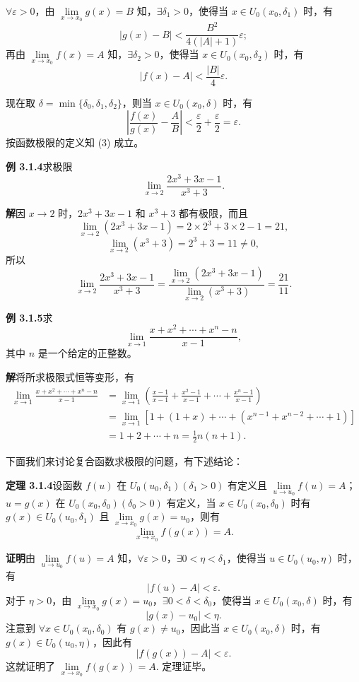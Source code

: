 \documentclass[UTF8,12pt,a4paper,fontset=fandol]{ctexart}
\begin{document}
$\forall\varepsilon>0$，由 $\lim\limits_{x\to x_0}g(x)=B$ 知，$\exists\delta_1>0$，使得当 $x\in U_0(x_0,\delta_1)$ 时，有
\[
  |g(x)-B|<\frac{B^2}{4(|A|+1)}\varepsilon;
\]
再由 $\lim\limits_{x\to x_0}f(x)=A$ 知，$\exists\delta_2>0$，使得当 $x\in U_0(x_0,\delta_2)$ 时，有
\[
  |f(x)-A|<\frac{|B|}{4}\varepsilon.
\]

现在取 $\delta=\min\{\delta_0,\delta_1,\delta_2\}$，则当 $x\in U_0(x_0,\delta)$ 时，有
\[
  \left|\frac{f(x)}{g(x)}-\frac{A}{B}\right|
  <\frac{\varepsilon}{2}+\frac{\varepsilon}{2}=\varepsilon.
\]
按函数极限的定义知 (3) 成立。

\noindent\textbf{例 3.1.4}\quad 求极限
\[
  \lim_{x\to2}\frac{2x^3+3x-1}{x^3+3}.
\]

\noindent\textbf{解}\quad 因 $x\to2$ 时，$2x^3+3x-1$ 和 $x^3+3$ 都有极限，而且
\[
  \lim_{x\to2}(2x^3+3x-1)=2\times2^3+3\times2-1=21,
\]
\[
  \lim_{x\to2}(x^3+3)=2^3+3=11\ne0,
\]
所以
\[
  \lim_{x\to2}\frac{2x^3+3x-1}{x^3+3}
  =\frac{\lim\limits_{x\to2}(2x^3+3x-1)}
  {\lim\limits_{x\to2}(x^3+3)}
  =\frac{21}{11}.
\]

\noindent\textbf{例 3.1.5}\quad 求
\[
  \lim_{x\to1}\frac{x+x^2+\cdots+x^n-n}{x-1},
\]
其中 $n$ 是一个给定的正整数。

\noindent\textbf{解}\quad 将所求极限式恒等变形，有
\[
\begin{aligned}
  \lim_{x\to1}\frac{x+x^2+\cdots+x^n-n}{x-1}
  &=\lim_{x\to1}\left(\frac{x-1}{x-1}+\frac{x^2-1}{x-1}+\cdots+\frac{x^n-1}{x-1}\right)\\
  &=\lim_{x\to1}\left[1+(1+x)+\cdots+(x^{n-1}+x^{n-2}+\cdots+1)\right]\\
  &=1+2+\cdots+n=\frac12 n(n+1).
\end{aligned}
\]

下面我们来讨论复合函数求极限的问题，有下述结论：

\noindent\textbf{定理 3.1.4}\quad 设函数 $f(u)$ 在 $U_0(u_0,\delta_1)(\delta_1>0)$ 有定义且 $\lim\limits_{u\to u_0}f(u)=A$；$u=g(x)$ 在 $U_0(x_0,\delta_0)(\delta_0>0)$ 有定义，当 $x\in U_0(x_0,\delta_0)$ 时有 $g(x)\in U_0(u_0,\delta_1)$ 且 $\lim\limits_{x\to x_0}g(x)=u_0$，则有
\[
  \lim_{x\to x_0}f(g(x))=A.
\]

\noindent\textbf{证明}\quad 由 $\lim\limits_{u\to u_0}f(u)=A$ 知，$\forall\varepsilon>0$，$\exists 0<\eta<\delta_1$，使得当 $u\in U_0(u_0,\eta)$ 时，有
\[
  |f(u)-A|<\varepsilon.
\]
对于 $\eta>0$，由 $\lim\limits_{x\to x_0}g(x)=u_0$，$\exists 0<\delta<\delta_0$，使得当 $x\in U_0(x_0,\delta)$ 时，有
\[
  |g(x)-u_0|<\eta.
\]
注意到 $\forall x\in U_0(x_0,\delta_0)$ 有 $g(x)\ne u_0$，因此当 $x\in U_0(x_0,\delta)$ 时，有 $g(x)\in U_0(u_0,\eta)$，因此有
\[
  |f(g(x))-A|<\varepsilon.
\]
这就证明了 $\lim\limits_{x\to x_0}f(g(x))=A$. 定理证毕。
\end{document}
